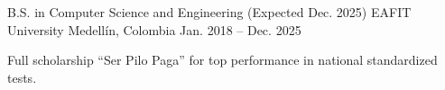 
\begin{cventries}
  \cventry
    {B.S. in Computer Science and Engineering (Expected Dec. 2025)}
    {EAFIT University}
    {Medellín, Colombia}
    {Jan. 2018 -- Dec. 2025}
    {
      \begin{cvitems}
        \item {Full scholarship “Ser Pilo Paga” for top performance in national standardized tests.}
      \end{cvitems}
    }
\end{cventries}
